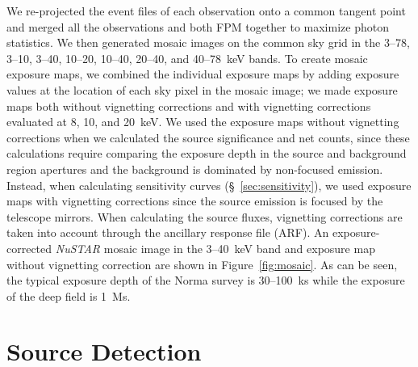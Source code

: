 \documentclass[iop,revtex4]{emulateapj}
\begin{document}
We re-projected the event files of each observation onto a common tangent point and merged all the observations and both FPM together to maximize photon statistics.  We then generated mosaic images on the common sky grid in the 3--78, 3--10, 3--40, 10--20, 10--40, 20--40, and 40--78~keV bands.  To create mosaic exposure maps, we combined the individual exposure maps by adding exposure values at the location of each sky pixel in the mosaic image; we made exposure maps both without vignetting corrections and with vignetting corrections evaluated at 8, 10, and 20~keV.  We used the exposure maps without vignetting corrections when we calculated the source significance and net counts, since these calculations require comparing the exposure depth in the source and background region apertures and the background is dominated by non-focused emission.  Instead, when calculating sensitivity curves (\S~\ref{sec:sensitivity}), we used exposure maps with vignetting corrections since the source emission is focused by the telescope mirrors.  When calculating the source fluxes, vignetting corrections are taken into account through the ancillary response file (ARF).  An exposure-corrected \textit{NuSTAR} mosaic image in the 3--40~keV band and exposure map without vignetting correction are shown in Figure~\ref{fig:mosaic}.  As can be seen, the typical exposure depth of the Norma survey is 30--100~ks while the exposure of the deep field is 1~Ms.

\section{Source Detection}
\label{sec:detection}
\end{document}
